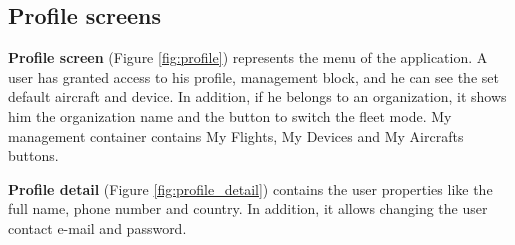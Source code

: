 \subsection{Profile screens}\label{subsec:profile-screens}
\textbf{Profile screen} (Figure \ref{fig:profile}) represents the menu of the application.
A user has granted access to his profile, management block, and he can see the set default aircraft and device.
In addition, if he belongs to an organization, it shows him the organization name and the button to switch the fleet mode.
My management container contains My Flights, My Devices and My Aircrafts buttons.

\textbf{Profile detail} (Figure \ref{fig:profile_detail}) contains the user properties like the full name, phone number and country.
In addition, it allows changing the user contact e-mail and password.


